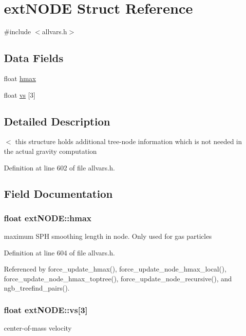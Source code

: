 \hypertarget{structextNODE}{
\section{extNODE Struct Reference}
\label{structextNODE}
}


{\ttfamily \#include $<$allvars.h$>$}

\subsection*{Data Fields}
\begin{DoxyCompactItemize}
\item 
float \hyperlink{structextNODE_ac479dcb30bffad0266b13b9200bbe9ad}{hmax}
\item 
float \hyperlink{structextNODE_a8fe64edf0e8598f60ff0ba73a04261bb}{vs} \mbox{[}3\mbox{]}
\end{DoxyCompactItemize}


\subsection{Detailed Description}
$<$ this structure holds additional tree-\/node information which is not needed in the actual gravity computation 

Definition at line 602 of file allvars.h.



\subsection{Field Documentation}
\hypertarget{structextNODE_ac479dcb30bffad0266b13b9200bbe9ad}{
\subsubsection[{hmax}]{\setlength{\rightskip}{0pt plus 5cm}float {\bf extNODE::hmax}}}
\label{structextNODE_ac479dcb30bffad0266b13b9200bbe9ad}
maximum SPH smoothing length in node. Only used for gas particles 

Definition at line 604 of file allvars.h.



Referenced by force\_\-update\_\-hmax(), force\_\-update\_\-node\_\-hmax\_\-local(), force\_\-update\_\-node\_\-hmax\_\-toptree(), force\_\-update\_\-node\_\-recursive(), and ngb\_\-treefind\_\-pairs().

\hypertarget{structextNODE_a8fe64edf0e8598f60ff0ba73a04261bb}{
\subsubsection[{vs}]{\setlength{\rightskip}{0pt plus 5cm}float {\bf extNODE::vs}\mbox{[}3\mbox{]}}}
\label{structextNODE_a8fe64edf0e8598f60ff0ba73a04261bb}
center-\/of-\/mass velocity 

